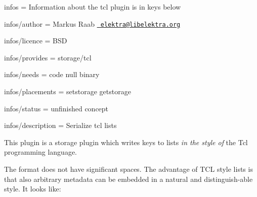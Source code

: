 
\begin{DoxyItemize}
\item infos = Information about the tcl plugin is in keys below
\item infos/author = Markus Raab \href{mailto:elektra@libelektra.org}{\texttt{ elektra@libelektra.\+org}}
\item infos/licence = B\+SD
\item infos/provides = storage/tcl
\item infos/needs = code null binary
\item infos/placements = setstorage getstorage
\item infos/status = unfinished concept
\item infos/description = Serialize tcl lists
\end{DoxyItemize}

This plugin is a storage plugin which writes keys to lists {\itshape in the style of} the Tcl programming language.

The format does not have significant spaces. The advantage of T\+CL style lists is that also arbitrary metadata can be embedded in a natural and distinguish-\/able style. It looks like\+:


\begin{DoxyCode}{0}
\DoxyCodeLine{\{}
\DoxyCodeLine{    \{}
\DoxyCodeLine{        \{}
\DoxyCodeLine{        \}}
\DoxyCodeLine{        \{}
\DoxyCodeLine{        \}}
\DoxyCodeLine{    \}}
\DoxyCodeLine{\}}
\end{DoxyCode}


